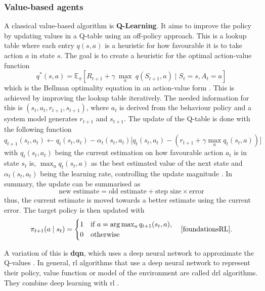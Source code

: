 \subsubsection{Value-based agents}
A classical value-based algorithm is \textbf{Q-Learning}. It aims to improve the policy by updating values in a Q-table using an off-policy approach. This is a lookup table where each entry $q(s,a)$ is a heuristic for how favourable it is to take action $a$ in state $s$. The goal is to create a heuristic for the optimal action-value function
\[q^*(s,a) = \mathbb{E}_{\pi}\!\left[ R_{t+1} + \gamma\ \max_a\ q(S_{t+1}, a) \mid S_t = s, A_t = a \right]\]
which is the Bellman optimality equation in an action-value form \cite{foundationsRL}. This is achieved by improving the lookup table iteratively. The needed information for this is $(s_t,a_t,r_{t+1},s_{t+1})$, where $a_t$ is derived from the behaviour policy and a system model generates $r_{t+1}$ and $s_{t+1}$. The update of the Q-table is done with the following function 
\[
q_{t+1}(s_t,a_t) \leftarrow q_t(s_t,a_t) - \alpha_t(s_t,a_t)
\Big[q_t(s_t,a_t) - (r_{t+1} + \gamma \max_a q_t(s_t,a))\Big]
\]
with $q_t(s_t,a_t)$ being the current estimation on how favourable action $a_t$ is in state $s_t$ is, $\max_a q_t(s_t,a)$ as the best estimated value of the next state and $\alpha_t(s_t,a_t)$ being the learning rate, controlling the update magnitude \cite{foundationsRL}. In summary, the update can be summarised as
\[
\text{new estimate} = \text{old estimate} + \text{step size} \times \text{error}
\]
thus, the current estimate is moved towards a better estimate using the current error. The target policy is then updated with 
\[
\pi_{t+1}(a \mid s_t) =
\begin{cases}
1 & \text{if } a = \arg\max_a q_{t+1}(s_t, a), \\
0 & \text{otherwise}
\end{cases}
\quad \text{\cite{foundationsRL}.}
\]

A variation of this is \textbf{\ac{dqn}}, which uses a deep neural network to approximate the Q-values \cite{grl4powergrids}. In general, \ac{rl} algorithms that use a deep neural network to represent their policy, value function or model of the environment are called \ac{drl} algorithms. They combine deep learning with \ac{rl} \cite{deepRLIntro}.

